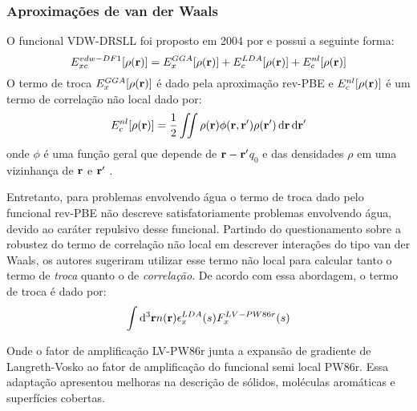 \subsubsection{Aproximações de van der Waals\label{sec:vdw}}

O funcional VDW-DRSLL foi proposto em 2004 por \citeauthor{DRSLL} e possui a seguinte forma:
\begin{equation}\label{eq:DRSLL}
	E^{vdw-DF1}_{xc}\bqty{\dens}=E^{GGA}_{x}\bqty{\dens}+E_{c}^{LDA}\bqty{\dens}+E^{nl}_{c}\bqty{\dens}
\end{equation}
O termo de troca $ E^{GGA}_{x}\bqty{\dens} $ é dado pela aproximação rev-PBE \cite{revPBE} e $ E^{nl}_{c}\bqty{\dens} $ é um termo de correlação não local dado por:
\begin{equation}\label{eq:correlacao-artigo}
	E^{nl}_{c}\bqty{\dens}=\frac{1}{2}\iint \dens\phi(\vb{r},\vb{r'})\denslinha\dr\drlinha
\end{equation}
onde $ \phi $ é uma função geral que depende de $ \vb{r}-\vb{r'} $$ q_0 $ e das densidades $ \rho $ em uma vizinhança de $ \vb{r} $ e $ \vb{r'} $ \cite{DRSLL}.

Entretanto, para problemas envolvendo água o termo de troca dado pelo funcional rev-PBE não descreve satisfatoriamente problemas envolvendo água, devido ao caráter repulsivo desse funcional. Partindo do questionamento sobre a robustez do termo de correlação não local em descrever interações do tipo van der Waals, os autores \citeauthor{vdw-bh} sugeriram utilizar esse termo não local para calcular tanto o termo de \textit{troca} quanto o de \textit{correlação}. De acordo com essa abordagem, o termo de troca é dado por:
\begin{equation}
	\int \dd^3\vb{r}n(\vb{r})\epsilon_x^{LDA}(s)F_x^{LV-PW86r}(s)
\end{equation}

Onde o fator de amplificação LV-PW86r junta a expansão de gradiente de Langreth-Vosko ao fator de amplificação do funcional semi local PW86r. Essa adaptação apresentou melhoras na descrição de sólidos, moléculas aromáticas e superfícies cobertas. \cite{vdw-bh} 

